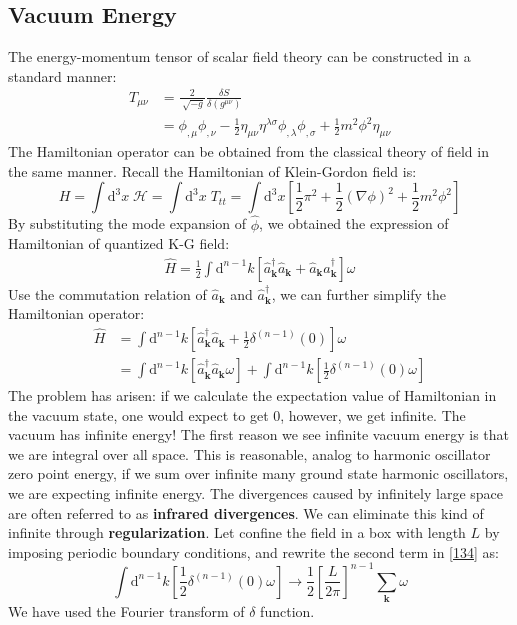 \documentclass[12pt]{article}
\numberwithin{equation}{subsection}
\theoremstyle{mystyle}{\newtheorem{definition}{Definition}[subsection]}
\theoremstyle{mystyle}{\newtheorem{theorem}[definition]{Theorem}}
\theoremstyle{mystyle}{\newtheorem*{remark}{Remark}}
\theoremstyle{mystyle}{\newtheorem{example}{Example}[subsection]}
\theoremstyle{mystyle}{\newtheorem{examples}{Examples}[subsection]}
\theoremstyle{mystyle}{\newtheorem{cthm}{}[subsection]}
\newcommand{\tbf}[1]{\textbf{#1}}
\newcommand{\id}{\mathrm{d}}
\begin{document}
\subsection{Vacuum Energy}
The energy-momentum tensor of scalar field theory can be constructed in a standard manner:
\begin{align}
  T_{\mu\nu} & =\frac{2}{\sqrt[]{-g}}\frac{\delta S}{\delta(g^{\mu\nu})}                                         \\
             & =\phi_{,\mu}\phi_{,\nu}-\frac{1}{2}\eta_{\mu\nu}\eta^{\lambda\sigma}\phi_{,\lambda}\phi_{,\sigma}
  +\frac{1}{2}m^2\phi^2\eta_{\mu\nu}
\end{align}
The Hamiltonian operator can be obtained from the classical theory of field in the same manner.
Recall the Hamiltonian of Klein-Gordon field is:
\begin{equation}
  H=\int\id^3x\;\mathcal{H}=\int\id^3x\;T_{tt}=\int\id^3x\left[\frac{1}{2}\pi^2+\frac{1}{2}(\nabla\phi)^2+\frac{1}{2}m^2\phi^2\right]
\end{equation}
By substituting the mode expansion of \(\hat{\phi}\), we obtained the expression of Hamiltonian of quantized K-G field:
\begin{align}
  \hat{H}=\frac{1}{2}\int \id^{n-1}k\left[\hat{a}^{\dagger}_{\mathbf{k}}\hat{a}_{\mathbf{k}}+\hat{a}_{\mathbf{k}}\hat{a}^{\dagger}_{\mathbf{k}}\right]\omega
\end{align}
Use the commutation relation of \(\hat{a}_{\mathbf{k}}\) and \(\hat{a}^{\dagger}_{\mathbf{k}}\), we can further simplify the Hamiltonian operator:
\begin{align}\label{134}
  \hat{H} & =\int \id^{n-1}k\left[\hat{a}^{\dagger}_{\mathbf{k}}\hat{a}_{\mathbf{k}}+\frac{1}{2}\delta^{(n-1)}(0)\right]\omega \\
          & =\int \id^{n-1}k\left[\hat{a}^{\dagger}_{\mathbf{k}}\hat{a}_{\mathbf{k}}\omega\right]+
  \int \id^{n-1}k\left[\frac{1}{2}\delta^{(n-1)}(0)\omega\right]
\end{align}
The problem has arisen: if we calculate the expectation value of Hamiltonian in the vacuum state, one would expect to get 0,
however, we get infinite.
The vacuum has infinite energy!
The first reason we see infinite vacuum energy is that we are integral over all space. This is reasonable, analog
to harmonic oscillator zero point energy,
if we sum over infinite many ground state harmonic oscillators, we are expecting infinite energy.
The divergences caused by infinitely large space are often referred to as \tbf{infrared divergences}.
We can eliminate this kind of infinite through \tbf{regularization}.
Let confine the field in a box with length \(L\) by imposing periodic boundary conditions, and rewrite the second term in \ref{134} as:
\begin{equation}\label{135}
  \int \id^{n-1}k\left[\frac{1}{2}\delta^{(n-1)}(0)\omega\right]\rightarrow\frac{1}{2}\left[\frac{L}{2\pi}\right]^{n-1}\sum_{\mathbf{k}}\omega
\end{equation}
We have used the Fourier transform of \(\delta\) function.
\end{document}
